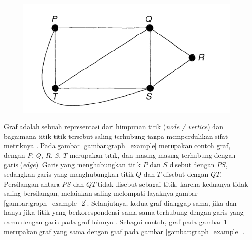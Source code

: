 \documentclass[
	a4paper, %
	12pt, %
	unnumberedsections, %
	twoside, %
]{LTJournalArticle}
\begin{document}
\begin{figure}
	\centering
	\includegraphics[keepaspectratio, width=0.48\linewidth]{gambar/graph_example_3}
	\caption{}
	\label{gambar:graph_example_3}
\end{figure}

Graf adalah sebuah representasi dari himpunan titik (\textit{node / vertice}) dan bagaimana titik-titik tersebut saling terhubung tanpa memperdulikan sifat metriknya \citep{wilson1996}. Pada gambar \ref{gambar:graph_example} merupakan contoh graf, dengan $P$, $Q$, $R$, $S$, $T$ merupakan titik, dan masing-masing terhubung dengan garis (\textit{edge}). Garis yang menghubungkan titik $P$ dan $S$ disebut dengan $PS$, sedangkan garis yang menghubungkan titik $Q$ dan $T$ disebut dengan $QT$. Persilangan antara $PS$ dan $QT$ tidak disebut sebagai titik, karena keduanya tidak saling bersilangan, melainkan saling melompati layaknya gambar \ref{gambar:graph_example_2}. Selanjutnya, kedua graf dianggap sama, jika dan hanya jika titik yang berkorespondensi sama-sama terhubung dengan garis yang sama dengan garis pada graf lainnya \citep{wilson1996}. Sebagai contoh, graf pada gambar \ref{gambar:graph_example_3} merupakan graf yang sama dengan graf pada gambar \ref{gambar:graph_example} \citep{wilson1996}. 
\end{document}
